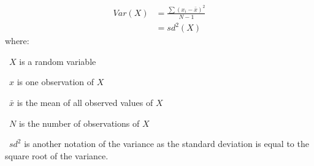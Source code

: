 \begin{equation}\label{eq:variance}
    \tag{Variance}
    \begin{split}
        Var(X) & =  \frac{\sum{{(x_{i}-\bar{x})}^{2}}}{N-1} \\ & = sd^{2}(X)
    \end{split}
\end{equation}
where:
\quad\begin{eqlist}[\setlength{\itemsep}{0em}%
            \setlength{\topsep}{0em}%
            \setlength{\partopsep}{0em}%
            \setlength{\parskip}{0em}%
            \setlength{\parsep}{0em}]
    \item[\textbullet\ $X$] is a random variable
    \item[\textbullet\ $x$] is one observation of $X$
    \item[\textbullet\ $\bar{x}$] is the mean of all observed values of $X$
    \item[\textbullet\ $N$] is the number of observations of $X$
    \item[\textbullet\ $sd^2$] is another notation of the variance as
           the standard deviation is equal to the square root of the variance.
\end{eqlist}
